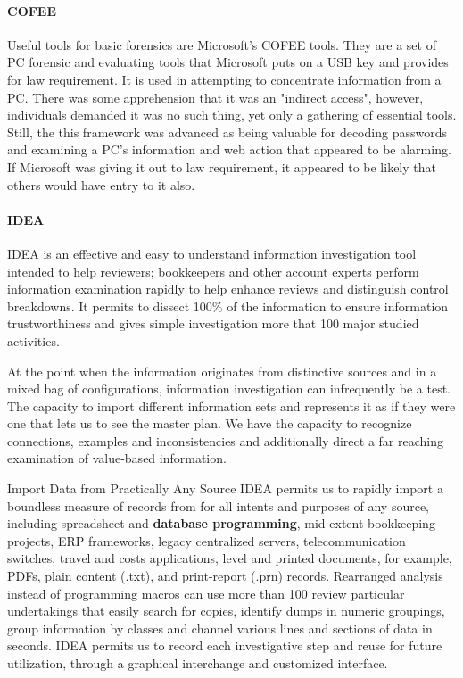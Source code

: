 \paragraph{COFEE}
Useful tools for basic forensics are Microsoft's COFEE tools. They are a set of PC forensic and evaluating tools that Microsoft puts on a USB key and provides for law requirement. It is used in attempting to concentrate information from a PC. There was some apprehension that it was an "indirect access", however, individuals demanded it was no such thing, yet only a gathering of essential tools. Still, the this framework was advanced as being valuable for decoding passwords and examining a PC's information and web action that appeared to be alarming. If Microsoft was giving it out to law requirement, it appeared to be likely that others would have entry to it also.


\paragraph{IDEA\textsuperscript{\textregistered}}
IDEA\textsuperscript{\textregistered} is an effective and easy to understand information investigation tool intended to help reviewers; bookkeepers and other account experts perform information examination rapidly to help enhance reviews and distinguish control breakdowns. It permits to dissect 100\% of the information to ensure information trustworthiness and gives simple investigation more that 100 major studied activities. 

At the point when the information originates from distinctive sources and in a mixed bag of configurations, information investigation can infrequently be a test. The capacity to import different information sets and represents it as if they were one that lets us to see the master plan. We have the capacity to recognize connections, examples and inconsistencies and additionally direct a far reaching examination of value-based information. 

Import Data from Practically Any Source IDEA\textsuperscript{\textregistered} permits us to rapidly import a boundless measure of records from for all intents and purposes of any source, including spreadsheet and \textbf{database programming}, mid-extent bookkeeping projects, ERP frameworks, legacy centralized servers, telecommunication switches, travel and costs applications, level and printed documents, for example, PDFs, plain content (.txt), and print-report (.prn) records. Rearranged analysis instead of programming macros can use more than 100 review particular undertakings that easily search for copies, identify dumps in numeric groupings, group information by classes and channel various lines and sections of data in seconds. IDEA\textsuperscript{\textregistered} permits us to record each investigative step and reuse for future utilization, through a graphical interchange and customized interface. 

